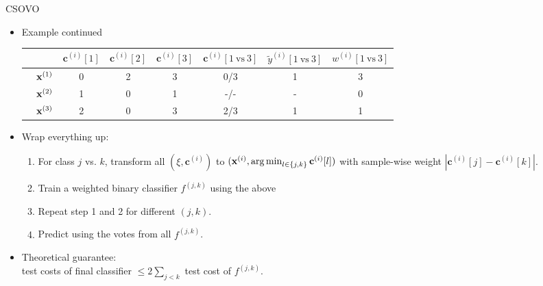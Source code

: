 \documentclass[10pt,compress,t,notes=noshow, xcolor=table]{beamer}
\newcommand{\cv}{\mathbf{c}}
\begin{document}
\begin{frame}{CSOVO}
    \begin{itemize}
    \item Example continued
    \begin{center}  
        \footnotesize{
            \begin{tabular}{cc|ccc|ccc}
                & & $\cv^{(i)}[1]$ & $\cv^{(i)}[2]$ & $\cv^{(i)}[3]$ & $\cv^{(i)}[1 \ \text{vs} \ 3]$ & $\tilde{y}^{( i)}[1 \ \text{vs} \ 3]$ & $w^{(i)}[1 \ \text{vs} \ 3]$\\
                \hline & $\mathbf{x}^{(1)}$ & 0 & 2 & 3 & 0/3 & 1 & 3\\
                & $\mathbf{x}^{(2)}$ & 1 & 0 & 1 & -/- & - & 0 \\
                & $\mathbf{x}^{(3)}$ & 2 & 0 & 3 & 2/3 & 1 & 1\\
            \end{tabular}
        }
    \end{center}

    \item Wrap everything up:
    \begin{enumerate}
        \item For class $j$ vs. $k$, transform all $(\xi, \cv^{(i)})$ to $(\xi, \argmin_{l \in \{j, k\}} \cv^{(i)}[l])$ with sample-wise weight $|\cv^{(i)}[j] - \cv^{(i)}[k]|$.
        
        \item Train a weighted binary classifier $f^{(j, k)}$ using the above
        
        \item Repeat step 1 and 2 for different $(j, k)$.
        
        \item Predict using the votes from all $f^{(j, k)}$.
    \end{enumerate}

    \item Theoretical guarantee:\\ 
    test costs of final classifier $\leq 2\sum_{j < k}$ test cost of $f^{(j, k)}$. 
    \end{itemize}
\end{frame}
\end{document}
